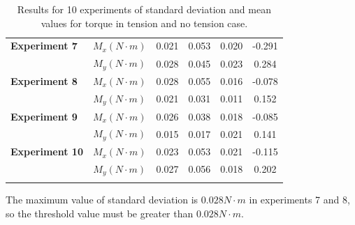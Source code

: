 \begin{longtable}{|r|c|c|c|c|c|}
		\cmidrule{1-1}\cmidrule{3-6}    \multicolumn{1}{|l|}{\textbf{Experiment 7}} & \textbf{$M_{x} (N \cdot m)$} & 0.021 & 0.053 & 0.020 & -0.291 \\
		\cmidrule{2-6}          & \textbf{$M_{y} (N \cdot m)$} & 0.028 & 0.045 & 0.023 & 0.284 \\
		\midrule
		\multicolumn{1}{|l|}{\textbf{Experiment 8}} & \textbf{$M_{x} (N \cdot m)$} & 0.028 & 0.055 & 0.016 & -0.078 \\
		\cmidrule{2-6}          & \textbf{$M_{y} (N \cdot m)$} & 0.021 & 0.031 & 0.011 & 0.152 \\
		\midrule
		\multicolumn{1}{|l|}{\textbf{Experiment 9}} & \textbf{$M_{x} (N \cdot m)$} & 0.026 & 0.038 & 0.018 & -0.085 \\
		\cmidrule{2-6}          & \textbf{$M_{y} (N \cdot m)$} & 0.015 & 0.017 & 0.021 & 0.141 \\
		\midrule
		\multicolumn{1}{|l|}{\textbf{Experiment 10}} & \textbf{$M_{x} (N \cdot m)$} & 0.023 & 0.053 & 0.021 & -0.115 \\
		\cmidrule{2-6}          & \textbf{$M_{y} (N \cdot m)$} & 0.027 & 0.056 & 0.018 & 0.202 \\
		\bottomrule
		\caption{Results for 10 experiments of standard deviation and mean values for torque in tension and no tension case.}
		\label{tab:experimenttorques}%
\end{longtable}%

The maximum value of standard deviation is $0.028 N\cdot m$ in experiments 7 and 8, so the threshold value must be greater than $0.028 N\cdot m$. 

